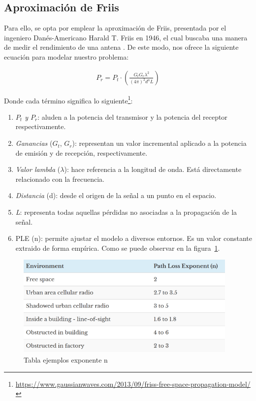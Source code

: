 \subsection{Aproximación de Friis}
\label{subsec:friis}

Para ello, se opta por emplear la aproximación de Friis, presentada por el ingeniero Danés-Americano Harald T. Friis en 1946, el cual buscaba una manera de medir el rendimiento de una antena \cite{johnson1984antenna}. De este modo, nos ofrece la siguiente ecuación para modelar nuestro problema:

\begin{align}
    P_r = P_t \cdot \left( \frac{G_t G_r \lambda^2 }{(4 \pi)^2 d^n L} \right)
\end{align}

Donde cada término significa lo siguiente\footnote[2]{\url{https://www.gaussianwaves.com/2013/09/friss-free-space-propagation-model/}}:

\begin{enumerate}
    \item \emph{$P_t$ y $P_r$}: aluden a la potencia del transmisor y la potencia del receptor respectivamente.

    \item \emph{Ganancias} ($G_t$, $G_r$): representan un valor incremental aplicado a la potencia de emisión y de recepción, respectivamente.

    \item \emph{Valor lambda} ($\lambda$): hace referencia a la longitud de onda. Está directamente relacionado con la frecuencia.

    \item \emph{Distancia} (d): desde el origen de la señal a un punto en el espacio.

    \item \emph{L}: representa todas aquellas pérdidas no asociadas a la propagación de la señal.

    \item \ac{PLE} (n): permite ajustar el modelo a diversos entornos. Es un valor constante extraido de forma empírica. Como se puede observar en la figura~\ref{fig:ple_table}.
\end{enumerate}

\begin{figure} [H]
	\begin{center}
	\includegraphics[height=5cm]{imagenes/cap4/4_PLE_table.png}
	\end{center}
	\caption[Tabla ejemplos exponente n]{Tabla ejemplos exponente n}
	\label{fig:ple_table}
\end{figure}

